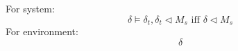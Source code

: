 \documentclass{llncs}
\begin{document}
For system:
$$\delta\models\delta_t,\delta_t\triangleleft M_s \text {  iff  } \delta\triangleleft M_s$$
For environment:
$$\delta$$
%
%
%
%
\end{document}
